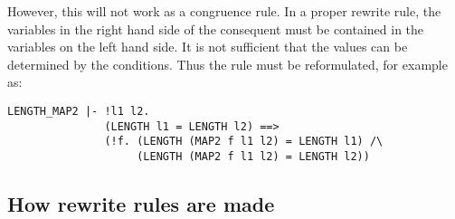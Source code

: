 However, this will not work as a congruence rule. In a proper rewrite
rule, the variables in the right hand side of the consequent must be
contained in the variables on the left hand side. It is not sufficient
that the values can be determined by the conditions. Thus the rule
must be reformulated, for example as:
\begin{hol} \begin{verbatim}
LENGTH_MAP2 |- !l1 l2.
               (LENGTH l1 = LENGTH l2) ==>
               (!f. (LENGTH (MAP2 f l1 l2) = LENGTH l1) /\
                    (LENGTH (MAP2 f l1 l2) = LENGTH l2))
\end{verbatim} \end{hol}


\subsection{How rewrite rules are made}

